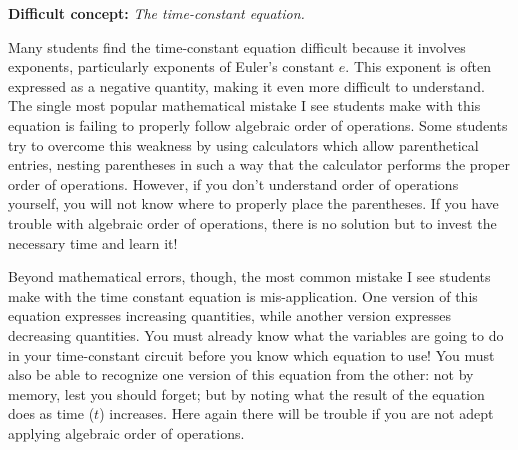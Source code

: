 \vskip 10pt

\noindent
{\bf Difficult concept: } {\it The time-constant equation.}

Many students find the time-constant equation difficult because it involves exponents, particularly exponents of Euler's constant $e$.  This exponent is often expressed as a negative quantity, making it even more difficult to understand.  The single most popular mathematical mistake I see students make with this equation is failing to properly follow algebraic order of operations.  Some students try to overcome this weakness by using calculators which allow parenthetical entries, nesting parentheses in such a way that the calculator performs the proper order of operations.  However, if you don't understand order of operations yourself, you will not know where to properly place the parentheses.  If you have trouble with algebraic order of operations, there is no solution but to invest the necessary time and learn it!

Beyond mathematical errors, though, the most common mistake I see students make with the time constant equation is mis-application.  One version of this equation expresses increasing quantities, while another version expresses decreasing quantities.  You must already know what the variables are going to do in your time-constant circuit before you know which equation to use!  You must also be able to recognize one version of this equation from the other: not by memory, lest you should forget; but by noting what the result of the equation does as time ($t$) increases.  Here again there will be trouble if you are not adept applying algebraic order of operations.

